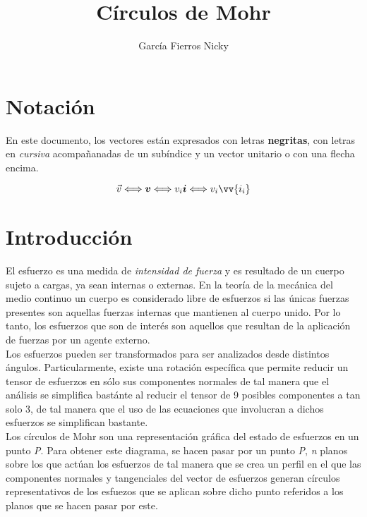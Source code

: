\documentclass{article}
\title{Círculos de Mohr}
\author{García Fierros Nicky}
\begin{document}
    \maketitle
    \newpage
    
    \tableofcontents
    \newpage

    \section*{Notación}

    En este documento, los vectores están expresados con letras \textbf{negritas}, con
    letras en \textit{cursiva} acompañanadas de un subíndice y un vector unitario o con
    una flecha encima.

    \begin{equation*}
        \vec{v} \Longleftrightarrow \bm{v} \Longleftrightarrow v_{i}\bm{i} \Longleftrightarrow v_{i}\vv{i_{i}}
    \end{equation*}

    \newpage

    \section{Introducción}

    El esfuerzo es una medida de \textit{intensidad de fuerza} y es resultado de un 
    cuerpo sujeto a cargas, ya sean internas o externas. En la teoría de la mecánica
    del medio continuo un cuerpo es considerado libre de esfuerzos si las únicas
    fuerzas presentes son aquellas fuerzas internas que mantienen al cuerpo unido.
    Por lo tanto, los esfuerzos que son de interés son aquellos que resultan de la
    aplicación de fuerzas por un agente externo.\\

    Los esfuerzos pueden ser transformados para ser analizados desde distintos ángulos.
    Particularmente, existe una rotación específica que permite reducir un tensor de
    esfuerzos en sólo sus componentes normales de tal manera que el análisis se
    simplifica bastánte al reducir el tensor de 9 posibles componentes a tan solo 3, de
    tal manera que el uso de las ecuaciones que involucran a dichos esfuerzos se
    simplifican bastante.\\
    
    Los círculos de Mohr son una representación gráfica del estado de esfuerzos en un punto 
    \textit{P}. Para obtener este diagrama, se hacen pasar por un punto \textit{P}, 
    \textit{n} planos \bm{$\eta$} sobre los que actúan los esfuerzos de tal manera que se 
    crea un perfil en el que las componentes normales y tangenciales del vector de esfuerzos 
     generan círculos representativos de los esfuezos que se aplican sobre 
    dicho punto referidos a los planos \bm{$\eta$} que se hacen pasar por este.\\
\end{document}
